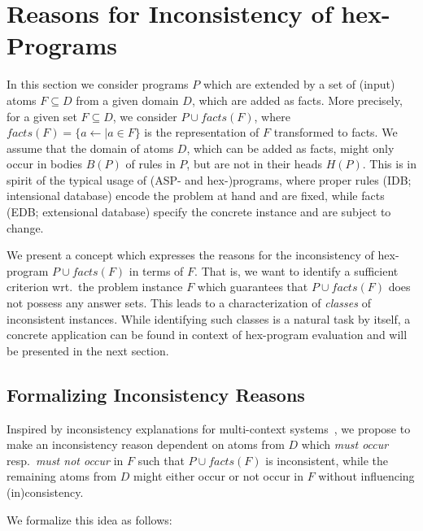 \documentclass[11pt,fleqn,twoside]{article}
\newcommand\hex{{\sc hex}\xspace}
\newcommand{\toFacts}[1]{\mathit{facts}(#1)}
\begin{document}
	\section{Reasons for Inconsistency of \hex-Programs}
	\label{sec:inconsistencyanalysis}

		In this section we consider programs $P$ which are extended by a set of (input) atoms $F \subseteq D$ from a given domain $D$, which are added as facts.
		More precisely, for a given set $F \subseteq D$, we consider $P \cup \toFacts{F}$, where $\toFacts{F} = \{ a \leftarrow \mid a \in F \}$ is the representation of $F$ transformed to facts.
		We assume that the domain of atoms $D$, which can be added as facts, might only occur in bodies $B(P)$ of rules in $P$, but are not in their heads $H(P)$.
		This is in spirit of the typical usage of (ASP- and \hex-)programs, where proper rules (IDB; intensional database) encode the problem at hand and are fixed,
		while facts (EDB; extensional database) specify the concrete instance and are subject to change.
		
		We present a concept which expresses the reasons for the inconsistency of \hex-program $P \cup \toFacts{F}$ in terms of $F$.
		That is, we want to identify a sufficient criterion wrt.~the problem instance $F$ which guarantees that $P \cup \toFacts{F}$ does not possess any answer sets.
		This leads to a characterization of \emph{classes} of inconsistent instances.
		While identifying such classes is a natural task by itself, a concrete application can be found in context of \hex-program evaluation and will be presented in the next section.

		\subsection{Formalizing Inconsistency Reasons}
		\label{sec:inconsistencyanalysis:formalizing}

			Inspired by inconsistency explanations for multi-context systems~\cite{DBLP:journals/ai/EiterFSW14},
			we propose to make an inconsistency reason dependent on atoms from $D$
			which \emph{must occur} resp.~\emph{must not occur} in $F$ such that $P \cup \toFacts{F}$ is inconsistent, while the remaining atoms from $D$ might either occur or not occur in $F$ without influencing (in)consistency.
			
			We formalize this idea as follows:%
			
\end{document}
